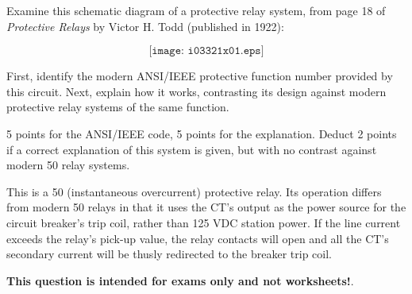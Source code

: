 

Examine this schematic diagram of a protective relay system, from page 18 of {\it Protective Relays} by Victor H. Todd (published in 1922):

$$\texttt{[image: i03321x01.eps]}$$

First, identify the modern ANSI/IEEE protective function number provided by this circuit.  Next, explain how it works, contrasting its design against modern protective relay systems of the same function.







5 points for the ANSI/IEEE code, 5 points for the explanation.  Deduct 2 points if a correct explanation of this system is given, but with no contrast against modern 50 relay systems.

\vskip 10pt

This is a 50 (instantaneous overcurrent) protective relay.  Its operation differs from modern 50 relays in that it uses the CT's output as the power source for the circuit breaker's trip coil, rather than 125 VDC station power.  If the line current exceeds the relay's pick-up value, the relay contacts will open and all the CT's secondary current will be thusly redirected to the breaker trip coil.







{\bf This question is intended for exams only and not worksheets!}.



